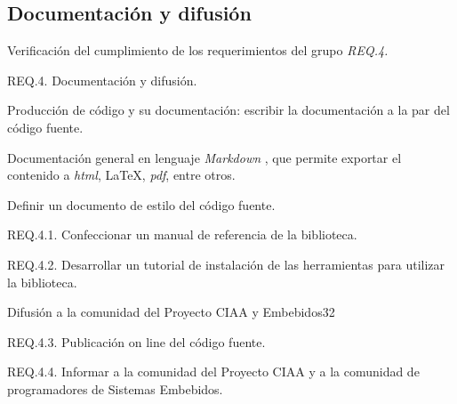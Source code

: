 \subsection{Documentación y difusión}
\label{sec:documentation}

Verificación del cumplimiento de los requerimientos del grupo \emph{REQ.4.}

REQ.4. Documentación y difusión.

Producción de código y su documentación: escribir la documentación a la par del código fuente.

Documentación general en lenguaje \emph{Markdown} \citep{MARKDOWN}, que permite exportar el contenido a \emph{html}, \LaTeX, \emph{pdf}, entre otros.

Definir un documento de estilo del código fuente.


REQ.4.1. Confeccionar un manual de referencia de la biblioteca.



REQ.4.2. Desarrollar un tutorial de instalación de las herramientas para utilizar la biblioteca.



Difusión a la comunidad del Proyecto CIAA y Embebidos32

REQ.4.3. Publicación on line del código fuente.

REQ.4.4. Informar a la comunidad del Proyecto CIAA y a la comunidad de programadores de Sistemas Embebidos.
